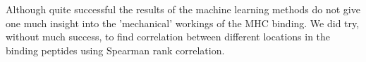 Although quite successful the results of the machine learning methods do not give one much insight into the 'mechanical' workings of the MHC binding.
We did try, without much success, to find correlation between different locations in the binding peptides using Spearman rank correlation.
